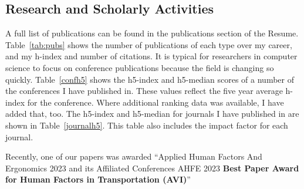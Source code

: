 \documentclass[12pt,letterpaper]{report}
\begin{document}
\subsection*{Research and Scholarly Activities}

A full list of publications can be found in the publications section of the Resume.  Table~\ref{tab:pubs} shows the number of publications of each type over my career, and my h-index and number of citations.  It is typical for researchers in computer science to focus on conference publications because the field is changing so quickly.  Table~\ref{confh5} shows the h5-index and h5-median scores of a number of the conferences I have published in.  These values reflect the five year average h-index for the conference.  Where additional ranking data was available, I have added that, too.  The h5-index and h5-median for journals I have published in are shown in Table~\ref{journalh5}.  This table also includes the impact factor for each journal. 

Recently, one of our papers was awarded ``Applied Human Factors And Ergonomics 2023 and its Affiliated Conferences AHFE 2023 \textbf{Best Paper Award for Human Factors in Transportation (AVI)}''

\end{document}
